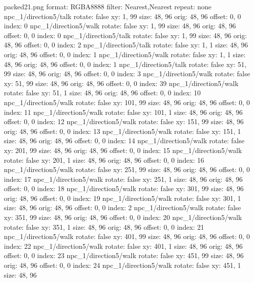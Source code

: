 packed21.png
format: RGBA8888
filter: Nearest,Nearest
repeat: none
npc_1/direction5/talk
  rotate: false
  xy: 1, 99
  size: 48, 96
  orig: 48, 96
  offset: 0, 0
  index: 0
npc_1/direction5/walk
  rotate: false
  xy: 1, 99
  size: 48, 96
  orig: 48, 96
  offset: 0, 0
  index: 0
npc_1/direction5/talk
  rotate: false
  xy: 1, 99
  size: 48, 96
  orig: 48, 96
  offset: 0, 0
  index: 2
npc_1/direction5/talk
  rotate: false
  xy: 1, 1
  size: 48, 96
  orig: 48, 96
  offset: 0, 0
  index: 1
npc_1/direction5/walk
  rotate: false
  xy: 1, 1
  size: 48, 96
  orig: 48, 96
  offset: 0, 0
  index: 1
npc_1/direction5/talk
  rotate: false
  xy: 51, 99
  size: 48, 96
  orig: 48, 96
  offset: 0, 0
  index: 3
npc_1/direction5/walk
  rotate: false
  xy: 51, 99
  size: 48, 96
  orig: 48, 96
  offset: 0, 0
  index: 39
npc_1/direction5/walk
  rotate: false
  xy: 51, 1
  size: 48, 96
  orig: 48, 96
  offset: 0, 0
  index: 10
npc_1/direction5/walk
  rotate: false
  xy: 101, 99
  size: 48, 96
  orig: 48, 96
  offset: 0, 0
  index: 11
npc_1/direction5/walk
  rotate: false
  xy: 101, 1
  size: 48, 96
  orig: 48, 96
  offset: 0, 0
  index: 12
npc_1/direction5/walk
  rotate: false
  xy: 151, 99
  size: 48, 96
  orig: 48, 96
  offset: 0, 0
  index: 13
npc_1/direction5/walk
  rotate: false
  xy: 151, 1
  size: 48, 96
  orig: 48, 96
  offset: 0, 0
  index: 14
npc_1/direction5/walk
  rotate: false
  xy: 201, 99
  size: 48, 96
  orig: 48, 96
  offset: 0, 0
  index: 15
npc_1/direction5/walk
  rotate: false
  xy: 201, 1
  size: 48, 96
  orig: 48, 96
  offset: 0, 0
  index: 16
npc_1/direction5/walk
  rotate: false
  xy: 251, 99
  size: 48, 96
  orig: 48, 96
  offset: 0, 0
  index: 17
npc_1/direction5/walk
  rotate: false
  xy: 251, 1
  size: 48, 96
  orig: 48, 96
  offset: 0, 0
  index: 18
npc_1/direction5/walk
  rotate: false
  xy: 301, 99
  size: 48, 96
  orig: 48, 96
  offset: 0, 0
  index: 19
npc_1/direction5/walk
  rotate: false
  xy: 301, 1
  size: 48, 96
  orig: 48, 96
  offset: 0, 0
  index: 2
npc_1/direction5/walk
  rotate: false
  xy: 351, 99
  size: 48, 96
  orig: 48, 96
  offset: 0, 0
  index: 20
npc_1/direction5/walk
  rotate: false
  xy: 351, 1
  size: 48, 96
  orig: 48, 96
  offset: 0, 0
  index: 21
npc_1/direction5/walk
  rotate: false
  xy: 401, 99
  size: 48, 96
  orig: 48, 96
  offset: 0, 0
  index: 22
npc_1/direction5/walk
  rotate: false
  xy: 401, 1
  size: 48, 96
  orig: 48, 96
  offset: 0, 0
  index: 23
npc_1/direction5/walk
  rotate: false
  xy: 451, 99
  size: 48, 96
  orig: 48, 96
  offset: 0, 0
  index: 24
npc_1/direction5/walk
  rotate: false
  xy: 451, 1
  size: 48, 96
